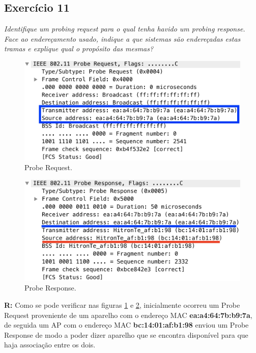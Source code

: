 \documentclass{llncs}
\begin{document}
\subsection{Exercício 11}
\emph{Identifique um probing request para o qual tenha havido um probing response. Face ao endereçamento usado, indique a que sistemas são endereçadas estas tramas e explique qual o propósito das mesmas?}
\begin{figure}[H]
\begin{center}
\includegraphics[scale=0.30]{11_Request.png} 
\end{center}
\caption{\label{fig:11_Request}Probe Request.}
\end{figure} 
\par
\begin{figure}[H]
\begin{center}
\includegraphics[scale=0.30]{11_Response.png} 
\end{center}
\caption{\label{fig:11_Response}Probe Response.}
\end{figure} 
\par
\textbf{R:} Como se pode verificar nas figuras \ref{fig:11_Request} e \ref{fig:11_Response}, inicialmente ocorreu um Probe Request proveniente de um aparelho com o endereço MAC \textbf{ea:a4:64:7b:b9:7a}, de seguida um AP com o endereço MAC \textbf{bc:14:01:af:b1:98} enviou um Probe Response de modo a poder dizer aparelho que se encontra disponível para que haja associação entre os dois.
\end{document}
